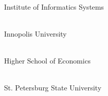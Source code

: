 
\cleardoublepage
{}

\newcommand\partner[3]{ \\ #3}

\partner{height=0.7in}{partners/iis}{ Institute of Informatics Systems}

\partner{height=0.7in}{partners/iu}{Innopolis University}

\partner{height=0.8in}{partners/hse}{Higher School of Economics}

\partner{height=0.7in}{partners/spbu}{St. Petersburg State University}
